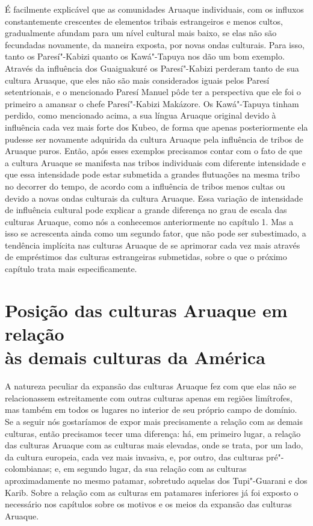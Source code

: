 É facilmente explicável que as comunidades Aruaque individuais, com os
influxos constantemente crescentes de elementos tribais estrangeiros e
menos cultos, gradualmente afundam para um nível cultural mais baixo,
se elas não são fecundadas novamente, da maneira exposta, por novas
ondas culturais. Para isso, tanto os Paresí"-Kabizi quanto os
Kawá"-Tapuya nos dão um bom exemplo. Através da influência dos
Guaiguakuré os Paresí"-Kabizi perderam tanto de sua cultura Aruaque, que
eles não são mais considerados iguais pelos Paresí setentrionais, e o
mencionado Paresí Manuel pôde ter a perspectiva que ele foi o primeiro a
amansar o chefe Paresí"-Kabizi Makázore. Os Kawá"-Tapuya tinham perdido,
como mencionado acima, a sua língua Aruaque original devido à
influência cada vez mais forte dos Kubeo, de forma que apenas
posteriormente ela pudesse ser novamente adquirida da cultura Aruaque
pela influência de tribos de Aruaque puros. Então, após esses exemplos
precisamos contar com o fato de que a cultura Aruaque se manifesta nas
tribos individuais com diferente intensidade e que essa intensidade pode
estar submetida a grandes flutuações na mesma tribo no decorrer do
tempo, de acordo com a influência de tribos menos cultas ou devido a
novas ondas culturais da cultura Aruaque. Essa variação de intensidade
de influência cultural pode explicar a grande diferença no grau de
escala das culturas Aruaque, como nós a conhecemos anteriormente no
capítulo 1. Mas a isso se acrescenta ainda como um segundo fator, que
não pode ser subestimado, a tendência implícita nas culturas Aruaque de
se aprimorar cada vez mais através de empréstimos das culturas
estrangeiras submetidas, sobre o que o próximo capítulo trata mais
especificamente.


\chapter[Posição das culturas Aruaque em relação às\\ demais culturas da América]{Posição das culturas Aruaque em relação\\ às demais culturas da América}

A natureza peculiar da expansão das culturas Aruaque fez com que elas
não se relacionassem estreitamente com outras culturas apenas em regiões
limítrofes, mas também em todos os lugares no interior de seu próprio
campo de domínio. Se a seguir nós gostaríamos de expor mais
precisamente a relação com as demais culturas, então precisamos tecer
uma diferença: há, em primeiro lugar, a relação das culturas Aruaque com
as culturas mais elevadas, onde se trata, por um lado, da cultura
europeia, cada vez mais invasiva, e, por outro, das culturas
pré"-colombianas; e, em segundo lugar, da sua relação com as culturas
aproximadamente no mesmo patamar, sobretudo aquelas dos Tupi"-Guarani e
dos Karib. Sobre a relação com as culturas em patamares inferiores já
foi exposto o necessário nos capítulos sobre os motivos e os meios da
expansão das culturas Aruaque.

